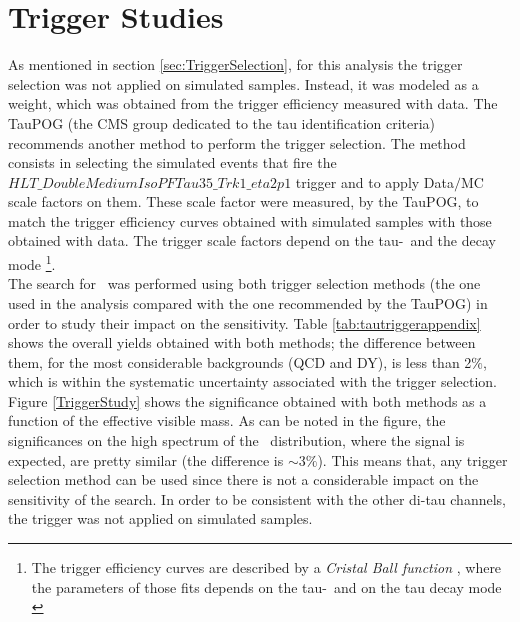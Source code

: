 \chapter{Trigger Studies}
\label{chap:TriggerStudies}

\noindent As mentioned in section \ref{sec:TriggerSelection}, for this analysis
the trigger selection was not applied on simulated samples. Instead, it 
was modeled as a weight, which was obtained from the 
trigger efficiency measured with data. The TauPOG (the CMS group dedicated to the tau identification 
criteria) recommends another method to perform the trigger selection. The method
consists in selecting the simulated events that fire the $HLT\_DoubleMediumIsoPFTau35\_Trk1\_eta2p1$
trigger and to apply Data$/$MC scale factors on them. These scale factor were 
measured, by the TauPOG, to match the trigger efficiency curves obtained with simulated samples 
with those obtained with data. The trigger scale factors depend on the tau-\pt~and the decay mode 
\footnote{The trigger efficiency curves are described by a \textit{Cristal Ball function} \cite{bib:TauPOGtriggerEff}, 
where the parameters of those fits depends on the tau-\pt~and on the tau decay mode \cite{bib:TauPOGTriggerSF}}.\\

\noindent The search for \Zprimetotauh~was performed using both
trigger selection methods (the one used in the analysis compared with the one 
recommended by the TauPOG) in order to study their impact on the 
sensitivity. Table \ref{tab:tautriggerappendix} shows the overall yields obtained with 
both methods; the difference between them, for the most considerable backgrounds 
(QCD and DY), is less than 2$\%$, which is within the 
systematic uncertainty associated with the trigger 
selection. Figure \ref{TriggerStudy} shows the significance obtained 
with both methods as a function of the effective visible mass. As can be 
noted in the figure, the significances on the high spectrum 
of the \mass~distribution, where the signal is expected, are 
pretty similar (the difference is $\sim$3$\%$). This means
that, any trigger selection method can be used since 
there is not a considerable impact on the sensitivity of
the search. In order to be consistent with the other 
di-tau channels, the trigger was not applied 
on simulated samples.\\

